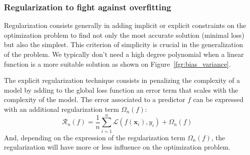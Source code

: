 \documentclass[main]{subfiles}
\begin{document}
\subsubsection{Regularization to fight against overfitting}

Regularization consists generally in adding implicit or explicit constraints on the optimization problem to find not only the most accurate solution (minimal loss) but also the simplest. This criterion of simplicity is crucial in the generalization of the problem. We typically don't need a high degree polynomial when a linear function is a more suitable solution as shown on Figure~\ref{fgr:bias_variance}. 

The explicit regularization technique consists in penalizing the complexity of a model by adding to the global loss function an error term that scales with the complexity of the model. The error associated to a predictor $f$ can be expressed with an additional regularization term ${\Omega}_n(f)$:
\begin{equation}
  \mathcal{R}_n(f) = \frac{1}{n}\sum_{i=1}^n \mathcal{L}\left(f(\mathbf{x}_i),y_i\right) + \Omega_n(f)
\end{equation}
And, depending on the expression of the regularization term ${\Omega}_n(f)$, the regularization will have more or less influence on the optimization problem. 
\end{document}
